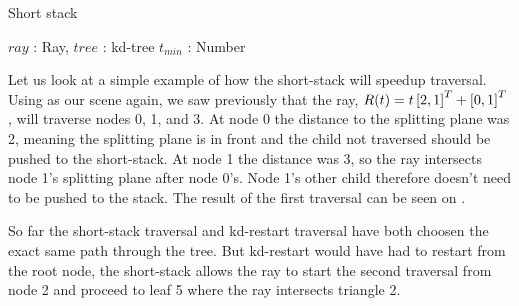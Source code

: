 \begin{algorithm}
  \caption{Short stack}
  \label{alg:ShortStack}
  \begin{algorithmic}
              {$ray$ : Ray, $tree$ : kd-tree}
              {$t_{min}$ : Number}{
      \ELSE
        \color{green}
      \ENDIF
            \color{green}
          \ENDIF
        \ELSE
        \ENDIF
      \ENDWHILE
      \ENDFOR
      \ENDIF
    \ENDWHILE
              }
  \end{algorithmic}
\end{algorithm}


Let us look at a simple example of how the short-stack will speedup
traversal. Using  as our scene again, we
saw previously that the ray, $R(t) = t \left[2, 1 \right]^T +
\left[0, 1 \right]^T$, will traverse nodes 0, 1, and 3. At node 0 the
distance to the splitting plane was 2, meaning the splitting plane is
in front and the child not traversed should be pushed to the
short-stack. At node 1 the distance was 3, so the ray intersects node
1's splitting plane after node 0's. Node 1's other child therefore
doesn't need to be pushed to the stack. The result of the first
traversal can be seen on .

So far the short-stack traversal and kd-restart traversal have both
choosen the exact same path through the tree. But kd-restart would
have had to restart from the root node, the short-stack allows the ray
to start the second traversal from node 2 and proceed to leaf 5 where
the ray intersects triangle 2. 

